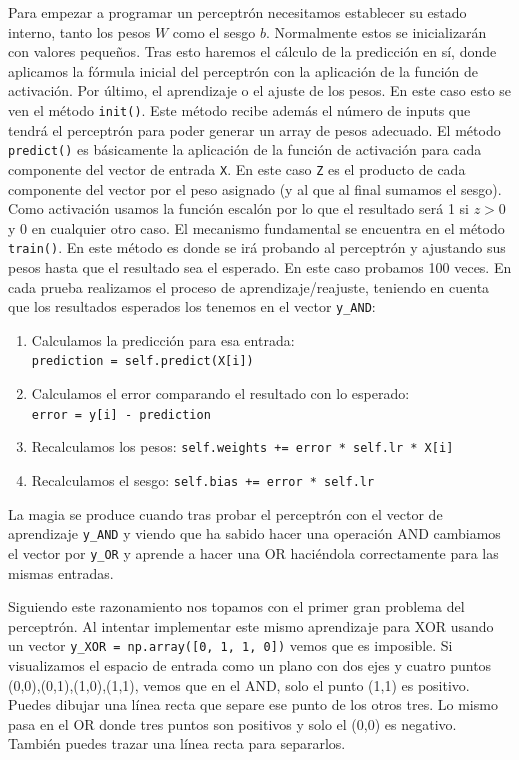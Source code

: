 \documentclass[a4paper,11pt]{article}
\begin{document}
Para empezar a programar un perceptrón necesitamos establecer su estado
interno, tanto los pesos \(W\) como el sesgo \(b\). Normalmente estos se
inicializarán con valores pequeños. Tras esto haremos el cálculo de la
predicción en sí, donde aplicamos la fórmula inicial del perceptrón con
la aplicación de la función de activación. Por último, el aprendizaje o
el ajuste de los pesos. En este caso esto se ven el método
\texttt{init()}. Este método recibe además el número de inputs que
tendrá el perceptrón para poder generar un array de pesos adecuado. El
método \texttt{predict()} es básicamente la aplicación de la función de
activación para cada componente del vector de entrada \texttt{X}. En
este caso \texttt{Z} es el producto de cada componente del vector por el
peso asignado (y al que al final sumamos el sesgo). Como activación
usamos la función escalón por lo que el resultado será 1 si \(z > 0\) y
0 en cualquier otro caso. El mecanismo fundamental se encuentra en el
método \texttt{train()}. En este método es donde se irá probando al
perceptrón y ajustando sus pesos hasta que el resultado sea el esperado.
En este caso probamos 100 veces. En cada prueba realizamos el proceso de
aprendizaje/reajuste, teniendo en cuenta que los resultados esperados
los tenemos en el vector \texttt{y\_AND}:

\begin{enumerate}
\item
  Calculamos la predicción para esa entrada:
  \texttt{prediction\ =\ self.predict(X{[}i{]})}
\item
  Calculamos el error comparando el resultado con lo esperado:
  \texttt{error\ =\ y{[}i{]}\ -\ prediction}
\item
  Recalculamos los pesos:
  \texttt{self.weights\ +=\ error\ *\ self.lr\ *\ X{[}i{]}}
\item
  Recalculamos el sesgo: \texttt{self.bias\ +=\ error\ *\ self.lr}
\end{enumerate}


La magia se produce cuando tras probar el perceptrón con el vector de
aprendizaje \texttt{y\_AND} y viendo que ha sabido hacer una operación
AND cambiamos el vector por \texttt{y\_OR} y aprende a hacer una OR
haciéndola correctamente para las mismas entradas.

Siguiendo este razonamiento nos topamos con el primer gran problema del
perceptrón. Al intentar implementar este mismo aprendizaje para XOR
usando un vector \texttt{y\_XOR\ =\ np.array({[}0,\ 1,\ 1,\ 0{]})} vemos
que es imposible. Si visualizamos el espacio de entrada como un plano
con dos ejes y cuatro puntos (0,0),(0,1),(1,0),(1,1), vemos que en el
AND, solo el punto (1,1) es positivo. Puedes dibujar una línea recta que
separe ese punto de los otros tres. Lo mismo pasa en el OR donde tres
puntos son positivos y solo el (0,0) es negativo. También puedes trazar
una línea recta para separarlos.
\end{document}
